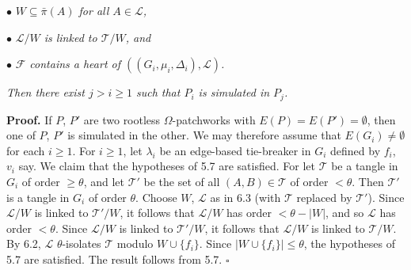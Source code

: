 \hspace*{12pt}$\bullet$ \textit{$W \subseteq \bar{\pi}(A)$ for all $A \in \mathcal{L}$,}

\hspace*{12pt}$\bullet$ \textit{$\mathcal{L}/W$ is linked to $\mathcal{T}/W$, and}

\hspace*{12pt}$\bullet$ \textit{$\mathcal{F}$ contains a heart of $((G_i, \mu_i, \Delta_i), \mathcal{L})$.}

\textit{Then there exist $j > i \ge 1$ such that $P_i$ is simulated in $P_j$.}

\textbf{Proof.} If $P$, $P'$ are two rootless $\Omega$-patchworks with $E(P) = E(P') = \emptyset$, then one of $P$, $P'$ is simulated in the other. We may therefore assume that $E(G_i) \ne \emptyset$ for each $i \ge 1$. For $i \ge 1$, let $\lambda_i$ be an edge-based tie-breaker in $G_i$ defined by $f_i$, $v_i$ say. We claim that the hypotheses of 5.7 are satisfied. For let $\mathcal{T}$ be a tangle in $G_i$ of order $\ge \theta$, and let $\mathcal{T}'$ be the set of all $(A, B) \in \mathcal{T}$ of order $< \theta$. Then $\mathcal{T}'$ is a tangle in $G_i$ of order $\theta$. Choose $W$, $\mathcal{L}$ as in 6.3 (with $\mathcal{T}$ replaced by $\mathcal{T}'$). Since $\mathcal{L}/W$ is linked to $\mathcal{T}'/W$, it follows that $\mathcal{L}/W$ has order $< \theta - |W|$, and so $\mathcal{L}$ has order $< \theta$. Since $\mathcal{L}/W$ is linked to $\mathcal{T}'/W$, it follows that $\mathcal{L}/W$ is linked to $\mathcal{T}/W$. By 6.2, $\mathcal{L}$ $\theta$-isolates $\mathcal{T}$ modulo $W \cup \{f_i\}$. Since $|W \cup \{f_i\}| \le \theta$, the hypotheses of 5.7 are satisfied. The result follows from 5.7. $\square$
